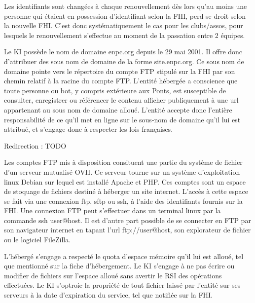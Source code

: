 \documentclass{ki019}
\begin{document}

Les identifiants sont changées à chaque renouvellement dès lors qu'au moins une personne qui étaient en possession d'identifiant selon la FHI, perd se droit selon la nouvelle FHI. C'est donc systématiquement le cas pour les clubs/assos, pour lesquels le renouvellement s'effectue au moment de la passation entre 2 équipes. 


Le KI possède le nom de domaine enpc.org depuis le 29 mai 2001. Il offre donc d'attribuer des sous nom de domaine de la forme site.enpc.org. Ce sous nom de domaine pointe vers le répertoire du compte FTP stipulé sur la FHI par son chemin relatif à la racine du compte FTP.
L'entité hébergée a conscience que toute personne ou bot, y compris extérieure aux Ponts, est susceptible de consulter, enregistrer ou référencer le contenu afficher publiquement à une url appartenant au sous nom de domaine alloué. L'entité accepte donc l'entière responsabilité de ce qu'il met en ligne sur le sous-nom de domaine qu'il lui est attribué, et s'engage donc à respecter les lois françaises.

Redirection : TODO


Les comptes FTP mis à disposition consituent une partie du système de fichier d'un serveur mutualisé OVH. Ce serveur tourne sur un système d'exploitation linux Debian sur lequel est installé Apache et PHP. Ces comptes sont un espace de stoquage de fichiers destiné à héberger un site internet. L'accès à cette espace se fait via une connexion ftp, sftp ou ssh, à l'aide des identifiants fournis sur la FHI. Une connexion FTP peut s'effectuer dans un terminal linux par la commande ssh user@host. Il est d'autre part possible de se connecter en FTP par son navigateur internet en tapant l'url ftp://user@host, son explorateur de fichier ou le logiciel FileZilla.


L'hébergé s'engage a respecté le quota d'espace mémoire qu'il lui est alloué, tel que mentionné sur la fiche d'hébergement.
Le KI s'engage à ne pas écrire ou modifier de fichiers sur l'espace alloué sans avertir le RSI des opérations effectuées.
Le KI s'optroie la propriété de tout fichier laissé par l'entité sur ses serveurs à la date d'expiration du service, tel que notifiée sur la FHI.

\end{document}
